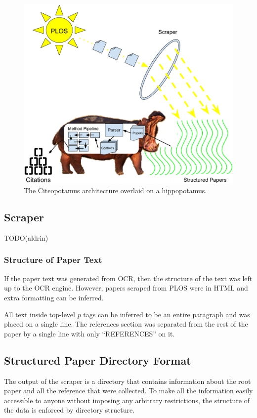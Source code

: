 \documentclass[10pt, conference, compsocconf]{IEEEtran}
\begin{document}
\begin{figure}[ht]
   \includegraphics[width=\textwidth px]{images/arch.eps}
        \caption{The Citeopotamus architecture overlaid on a hippopotamus.}
        \label{fig:arch}
\end{figure}

\subsection{Scraper}
TODO(aldrin)

\subsubsection{Structure of Paper Text}
If the paper text was generated from OCR, then the structure of the text was left up to the OCR engine.
However, papers scraped from PLOS were in HTML and extra formatting can be inferred.

All text inside top-level $p$ tags can be inferred to be an entire paragraph and was placed on a single line.
The references section was separated from the rest of the paper by a single line with only ``REFERENCES'' on it.

\subsection{Structured Paper Directory Format}\label{sec:paperFormat}
The output of the scraper is a directory that contains information about the root paper and all the reference that were collected.
To make all the information easily accessible to anyone without imposing any arbitrary restrictions, the structure of the
data is enforced by directory structure.
\end{document}

